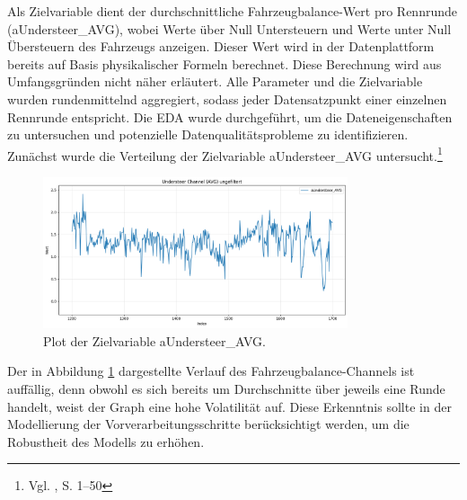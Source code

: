   Als Zielvariable dient der durchschnittliche Fahrzeugbalance-Wert pro Rennrunde (aUndersteer\_AVG), wobei Werte über Null Untersteuern und Werte unter Null Übersteuern des Fahrzeugs anzeigen. Dieser Wert wird in der Datenplattform bereits auf Basis physikalischer Formeln berechnet. Diese Berechnung wird aus Umfangsgründen nicht näher erläutert. Alle Parameter und die Zielvariable wurden rundenmittelnd aggregiert, sodass jeder Datensatzpunkt einer einzelnen Rennrunde entspricht.
  Die \ac{EDA} wurde durchgeführt, um die Dateneigenschaften zu untersuchen und potenzielle Datenqualitätsprobleme zu identifizieren. Zunächst wurde die Verteilung der Zielvariable aUndersteer\_AVG untersucht.\footnote{Vgl. \cite{Tukey1977}, S. 1–50}
\begin{figure}[H]
  \centering
  \includegraphics[width=0.8\textwidth]{graphics/understeer_nonfilt.png}
  \caption{Plot der Zielvariable aUndersteer\_AVG.}
  \label{fig:understeer_distribution}
\end{figure}
Der in Abbildung \ref{fig:understeer_distribution} dargestellte Verlauf des Fahrzeugbalance-Channels ist auffällig, denn obwohl es sich bereits um Durchschnitte über jeweils eine Runde handelt, weist der Graph eine hohe Volatilität auf.
Diese Erkenntnis sollte in der Modellierung der Vorverarbeitungsschritte berücksichtigt werden, um die Robustheit des Modells zu erhöhen.

